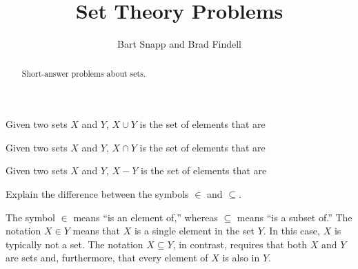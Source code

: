 \documentclass[nooutcomes]{ximera}
\title{Set Theory Problems}
\author{Bart Snapp and Brad Findell}
\begin{document}
\begin{abstract}
Short-answer problems about sets. 
\end{abstract}
\maketitle

\begin{problem}
Given two sets $X$ and $Y$, $X\cup Y$ is the set of elements that are
\begin{multipleChoice}
\end{multipleChoice}
\end{problem}

\begin{problem}
Given two sets $X$ and $Y$, $X\cap Y$ is the set of elements that are 
\begin{multipleChoice}
\end{multipleChoice}
\end{problem}

\begin{problem}
Given two sets $X$ and $Y$, $X - Y$ is the set of elements that are 
\begin{multipleChoice}
\end{multipleChoice}
\end{problem}

\begin{problem}
Explain the difference between the symbols $\in$ and $\subseteq$.
\begin{freeResponse}
\begin{hint}
The symbol $\in$ means ``is an element of,'' whereas $\subseteq$ means ``is a subset of.'' 
The notation $X \in Y$ means that $X$ is a single element in the set $Y$.  In this case, $X$ is typically not a set.  The notation $X \subseteq Y$, in contrast, requires that both $X$ and $Y$ are sets and, furthermore, that every element of $X$ is also in $Y$.
\end{hint}
\end{freeResponse}
\end{problem}
\end{document}
